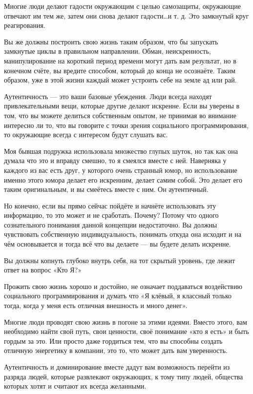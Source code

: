 Многие люди делают гадости окружающим с целью самозащиты, окружающие отвечают им тем же, затем они снова делают гадости\ldots и т. д. Это замкнутый круг реагирования.

Вы же должны построить свою жизнь таким образом, что бы запускать замкнутые циклы в правильном направлении. Обман, неискренность, манипулирование на короткий период времени могут дать вам результат, но в конечном счёте, вы вредите способом, который до конца не осознаёте. Таким образом, уже в этой жизни каждый может устроить себе на земле ад или рай.

Аутентичность --- это ваши базовые убеждения. Люди всегда находят привлекательными вещи, которые другие делают искренне. Если вы уверены в том, что вы можете делиться собственным опытом, не принимая во внимание интересно ли то, что вы говорите с точки зрения социального программирования, то окружающие всегда с интересом будут слушать вас.

Моя бывшая подружка использовала множество глупых шуток, но так как она думала что это и вправду смешно, то я смеялся вместе с ней. Наверняка у каждого из вас есть друг, у которого очень странный юмор, но использование именно этого юмора делает его искренним, делает самим собой. Это делает его таким оригинальным, и вы смеётесь вместе с ним. Он аутентичный.

Но конечно, если вы прямо сейчас пойдёте и начнёте использовать эту информацию, то это может и не сработать. Почему? Потому что одного сознательного понимания данной концепции недостаточно. Вы должны чувствовать собственную индивидуальность, понимать откуда она исходит и на чём основывается и тогда всё что вы делаете --- вы будете делать искренне.

Вы должны копнуть глубоко внутрь себя, на тот скрытый уровень, где лежит ответ на вопрос «Кто Я?»

Прожить свою жизнь хорошо и достойно, не означает поддаваться воздействию социального программирования и думать что «Я клёвый, я классный только тогда, когда у меня есть отличная внешность и много денег».

Многие люди проводят свою жизнь в погоне за этими идеями. Вместо этого, вам необходимо найти свой путь, свои ценности, своё понимание «кто я есть» и быть гордым за это. Или просто даже гордиться тем, что вы способны создать отличную энергетику в компании, это то, что может дать вам уверенность.

Аутентичность и доминирование вместе дадут вам возможность перейти из разряда людей, которые развлекают окружающих, к тому типу людей, общества которых хотят и считают их всегда желанными.

